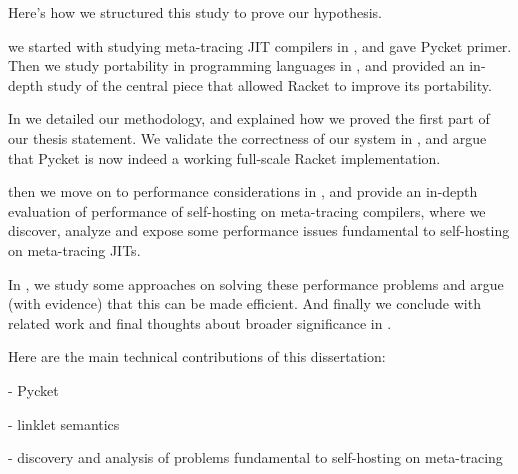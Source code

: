     \begin{mainpoint}
        Here's how we structured this study to prove our hypothesis.
    \end{mainpoint}

    \begin{paragraph-here}%
        we started with studying meta-tracing JIT compilers in , and gave Pycket primer. Then we study portability in programming languages in , and provided an in-depth study of the central piece that allowed Racket to improve its portability.
    \end{paragraph-here}

    \begin{paragraph-here}%
        In  we detailed our methodology, and explained how we proved the first part of our thesis statement. We validate the correctness of our system in , and argue that Pycket is now indeed a working full-scale Racket implementation.
    \end{paragraph-here}

    \begin{paragraph-here}%
        then we move on to performance considerations in , and provide an in-depth evaluation of performance of self-hosting on meta-tracing compilers, where we discover, analyze and expose some performance issues fundamental to self-hosting on meta-tracing JITs.
    \end{paragraph-here}

    \begin{paragraph-here}%
        In , we study some approaches on solving these performance problems and argue (with evidence) that this can be made efficient. And finally we conclude with related work and final thoughts about broader significance in .
    \end{paragraph-here}

    \begin{paragraph-here}%
        Here are the main technical contributions of this dissertation:

        - Pycket

        - linklet semantics

        - discovery and analysis of problems fundamental to self-hosting on meta-tracing
    \end{paragraph-here}

